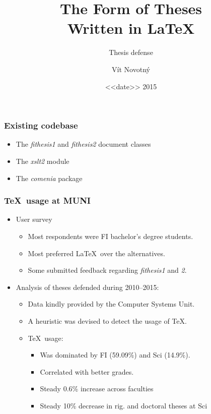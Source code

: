 \documentclass[12pt]{beamer}
\title{The Form of Theses\\ Written in \LaTeX}
\subtitle{Thesis defense}
\date[2015]{<<date>> 2015}
\author{Vít Novotný}
\institute[FI MUNI]{Masaryk University in Brno\\ Faculty of Informatics}
\begin{document}
  \frame{\maketitle}
  \begin{frame}
    \frametitle{Existing codebase}
    \begin{itemize}[<+->]
      \item The \emph{fithesis1} and \emph{fithesis2} document classes
      \item The \emph{xslt2} module
      \item The \emph{comenia} package
    \end{itemize}
  \end{frame}
  \begin{frame}
    \frametitle{\TeX\ usage at MUNI}
    \begin{itemize}[<+->]
      \item User survey
      \begin{itemize}
        \item Most respondents were FI bachelor's degree students.
        \item Most preferred \LaTeX\ over the alternatives.
        \item Some submitted feedback regarding \emph{fithesis1} and \emph{2}.
      \end{itemize}
      \item Analysis of theses defended during 2010--2015:
      \begin{itemize}
        \item Data kindly provided by the Computer Systems Unit.
        \item A heuristic was devised to detect the usage of \TeX.
        \item \TeX\ usage:
          \begin{itemize}
            \item Was dominated by FI (59.09\%) and Sci (14.9\%).
            \item Correlated with better grades.
            \item Steady 0.6\% increase across faculties
            \item Steady 10\% decrease in rig. and doctoral theses at Sci
          \end{itemize}
      \end{itemize}
    \end{itemize}
  \end{frame}
\end{document}
